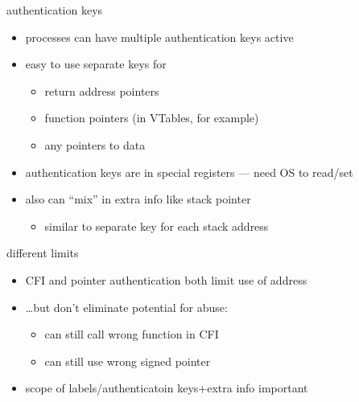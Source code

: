 \begin{frame}{authentication keys}
    \begin{itemize}
    \item processes can have multiple authentication keys active
    \item easy to use separate keys for
        \begin{itemize}
        \item return address pointers
        \item function pointers (in VTables, for example)
        \item any pointers to data
        \end{itemize}
    \item authentication keys are in special registers --- need OS to read/set
    \vspace{.5cm}
    \item also can ``mix'' in extra info like stack pointer
        \begin{itemize}
        \item similar to separate key for each stack address
        \end{itemize}
    \end{itemize}
\end{frame}

\begin{frame}{different limits}
    \begin{itemize}
    \item CFI and pointer authentication both limit use of address
    \item \ldots but don't eliminate potential for abuse:
        \begin{itemize}
        \item can still call wrong function in CFI
        \item can still use wrong signed pointer
        \end{itemize}
    \item scope of labels/authenticatoin keys+extra info important
    \end{itemize}
\end{frame}
